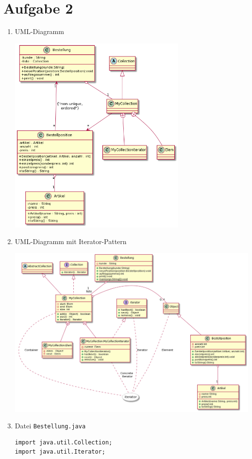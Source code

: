 \documentclass{article}
\begin{document}
	\section*{Aufgabe 2}
	\begin{enumerate}[label=(\alph*)]
		\item UML-Diagramm
		\begin{center}
			\includegraphics[width=0.70\textwidth]{aufgabe2a}
		\end{center}
		\item UML-Diagramm mit Iterator-Pattern
		\begin{center}
			\includegraphics[width=1\textwidth]{aufgabe2b}
		\end{center}
		\item Datei \texttt{Bestellung.java}
		\begin{lstlisting}[style=java, tabsize=2]
import java.util.Collection;
import java.util.Iterator;


\end{lstlisting}
\end{enumerate}
\end{document}
